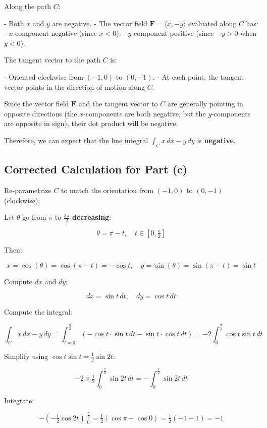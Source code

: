 \documentclass[11pt]{article}
\begin{document}
Along the path $C$:

- Both $x$ and $y$ are negative.
- The vector field $\mathbf{F} = \langle x, -y \rangle$ evaluated along $C$ has:
  - $x$-component negative (since $x < 0$).
  - $y$-component positive (since $-y > 0$ when $y < 0$).

The tangent vector to the path $C$ is:

- Oriented clockwise from $(-1, 0)$ to $(0, -1)$.
- At each point, the tangent vector points in the direction of motion along $C$.

Since the vector field $\mathbf{F}$ and the tangent vector to $C$ are generally pointing in opposite directions (the $x$-components are both negative, but the $y$-components are opposite in sign), their dot product will be negative.

Therefore, we can expect that the line integral $\displaystyle \int_C x \, dx - y \, dy$ is \textbf{negative}.

\newpage

\subsection{Corrected Calculation for Part (c)}

Re-parametrize $C$ to match the orientation from $(-1, 0)$ to $(0, -1)$ (clockwise):

Let $\theta$ go from $\pi$ to $\tfrac{3\pi}{2}$ \textbf{decreasing}:

\[
\theta = \pi - t, \quad t \in [0, \tfrac{\pi}{2}]
\]

Then:

\[
x = \cos(\theta) = \cos(\pi - t) = -\cos t, \quad y = \sin(\theta) = \sin(\pi - t) = \sin t
\]

Compute $dx$ and $dy$:

\[
dx = \sin t \, dt, \quad dy = \cos t \, dt
\]

Compute the integral:

\[
\int_C x \, dx - y \, dy = \int_{t=0}^{\tfrac{\pi}{2}} \left( -\cos t \cdot \sin t \, dt - \sin t \cdot \cos t \, dt \right) = -2 \int_{0}^{\tfrac{\pi}{2}} \cos t \sin t \, dt
\]

Simplify using $\cos t \sin t = \tfrac{1}{2} \sin 2t$:

\[
-2 \times \tfrac{1}{2} \int_{0}^{\tfrac{\pi}{2}} \sin 2t \, dt = -\int_{0}^{\tfrac{\pi}{2}} \sin 2t \, dt
\]

Integrate:

\[
-\left( -\tfrac{1}{2} \cos 2t \right) \Big|_{0}^{\tfrac{\pi}{2}} = \tfrac{1}{2} \left( \cos \pi - \cos 0 \right) = \tfrac{1}{2} \left( -1 - 1 \right) = -1
\]
\end{document}
